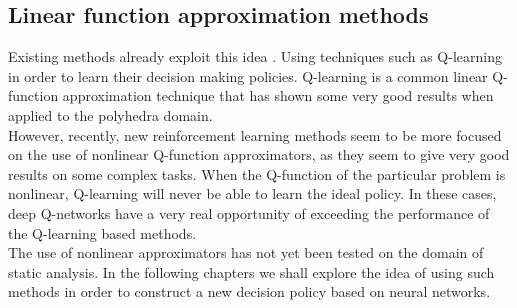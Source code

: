 \subsection{Linear function approximation methods}
Existing methods already exploit this idea \cite{singh2018fast}. Using techniques such as Q-learning in order to learn their decision making policies. Q-learning is a common linear Q-function approximation technique that has shown some very good results when applied to the polyhedra domain.\\
However, recently, new reinforcement learning methods seem to be more focused on the use of nonlinear Q-function approximators, as they seem to give very good results on some  complex tasks. When the Q-function of the particular problem is nonlinear, Q-learning will never be able to learn the ideal policy. In these cases, deep Q-networks have a very real opportunity of exceeding the performance of the Q-learning based methods.\\
The use of nonlinear approximators has not yet been tested on the domain of static analysis. In the following chapters we shall explore the idea of using such methods in order to construct a new decision policy based on neural networks.
















